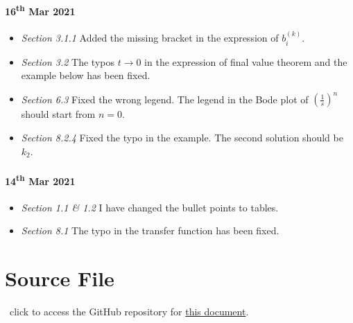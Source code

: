 \paragraph{16\textsuperscript{th} Mar 2021}
\begin{itemize}
    \item \textit{Section 3.1.1} \quad Added the missing bracket in the expression of $b_{i}^{(k)}$.
    \item \textit{Section 3.2} \quad The typos $t \to 0$ in the expression of final value theorem and the example below has been fixed. 
    \item \textit{Section 6.3} \quad Fixed the wrong legend. The legend in the Bode plot of $(\frac{1}{s})^{n}$ should start from $n=0$.
    \item \textit{Section 8.2.4} \quad Fixed the typo in the example. The second solution should be  $k_{2}$.
\end{itemize}

\paragraph{14\textsuperscript{th} Mar 2021}
\begin{itemize}
    \item \textit{Section 1.1 \& 1.2} \quad I have changed the bullet points to tables.
    \item \textit{Section 8.1} \quad The typo in the transfer function has been fixed.
\end{itemize}

\section*{Source File}
\faGithub \ click to access the GitHub repository for \href{https://github.com/binghuan-li/Notes-and-Formula-Sheets}{this document}.